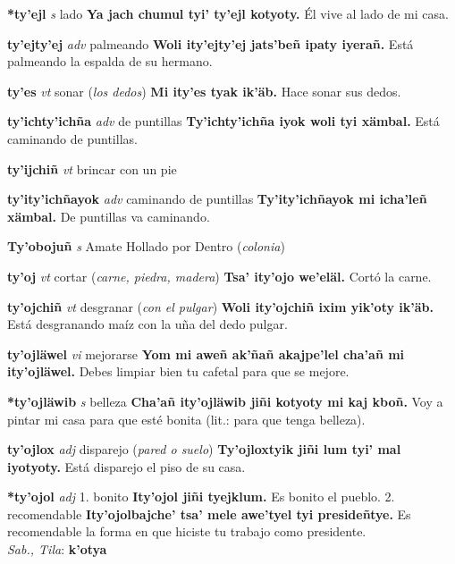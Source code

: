 \documentclass[10pt]{scrbook}
\newcommand{\entry}[1]{\textbf{#1}}
\newcommand{\onedefinition}[1]{#1.}
\newcommand{\partofspeech}[1]{\textit{#1}}
\newcommand{\spanishtranslation}[1]{#1}
\newcommand{\clarification}[1]{(\textit{#1})}
\newcommand{\cholexample}[1]{\textbf{#1}}
\newcommand{\exampletranslation}[1]{#1}
\newcommand{\dialectvariant}[1]{\\\textit{#1}:}
\newcommand{\dialectword}[1]{\textbf{#1}}
\begin{document}
\begin{multicols}{2}
\entry{*ty'ejl}
\partofspeech{s}
\spanishtranslation{lado}
\cholexample{Ya jach chumul tyi' ty'ejl kotyoty.}
\exampletranslation{Él vive al lado de mi casa.}

\entry{ty'ejty'ej}
\partofspeech{adv}
\spanishtranslation{palmeando}
\cholexample{Woli ity'ejty'ej jats'beñ ipaty iyerañ.}
\exampletranslation{Está palmeando la espalda de su hermano.}

\entry{ty'es}
\partofspeech{vt}
\spanishtranslation{sonar}
\clarification{los dedos}
\cholexample{Mi ity'es tyak ik'äb.}
\exampletranslation{Hace sonar sus dedos.}

\entry{ty'ichty'ichña}
\partofspeech{adv}
\spanishtranslation{de puntillas}
\cholexample{Ty'ichty'ichña iyok woli tyi xämbal.}
\exampletranslation{Está caminando de puntillas.}

\entry{ty'ijchiñ}
\partofspeech{vt}
\spanishtranslation{brincar con un pie}

\entry{ty'ity'ichñayok}
\partofspeech{adv}
\spanishtranslation{caminando de puntillas}
\cholexample{Ty'ity'ichñayok mi icha'leñ xämbal.}
\exampletranslation{De puntillas va caminando.}

\entry{Ty'obojuñ}
\partofspeech{s}
\spanishtranslation{Amate Hollado por Dentro}
\clarification{colonia}

\entry{ty'oj}
\partofspeech{vt}
\spanishtranslation{cortar}
\clarification{carne, piedra, madera}
\cholexample{Tsa' ity'ojo we'eläl.}
\exampletranslation{Cortó la carne.}

\entry{ty'ojchiñ}
\partofspeech{vt}
\spanishtranslation{desgranar}
\clarification{con el pulgar}
\cholexample{Woli ity'ojchiñ ixim yik'oty ik'äb.}
\exampletranslation{Está desgranando maíz con la uña del dedo pulgar.}

\entry{ty'ojläwel}
\partofspeech{vi}
\spanishtranslation{mejorarse}
\cholexample{Yom mi aweñ ak'ñañ akajpe'lel cha'añ mi ity'ojläwel.}
\exampletranslation{Debes limpiar bien tu cafetal para que se mejore.}

\entry{*ty'ojläwib}
\partofspeech{s}
\spanishtranslation{belleza}
\cholexample{Cha'añ ity'ojläwib jiñi kotyoty mi kaj kboñ.}
\exampletranslation{Voy a pintar mi casa para que esté bonita (lit.: para que tenga belleza).}

\entry{ty'ojlox}
\partofspeech{adj}
\spanishtranslation{disparejo}
\clarification{pared o suelo}
\cholexample{Ty'ojloxtyik jiñi lum tyi' mal iyotyoty.}
\exampletranslation{Está disparejo el piso de su casa.}

\entry{*ty'ojol}
\partofspeech{adj}
\onedefinition{1}
\spanishtranslation{bonito}
\cholexample{Ity'ojol jiñi tyejklum.}
\exampletranslation{Es bonito el pueblo.}
\onedefinition{2}
\spanishtranslation{recomendable}
\cholexample{Ity'ojolbajche' tsa' mele awe'tyel tyi presideñtye.}
\exampletranslation{Es recomendable la forma en que hiciste tu trabajo como presidente.}
\dialectvariant{Sab., Tila}
\dialectword{k'otya}


\end{multicols}
\end{document}

